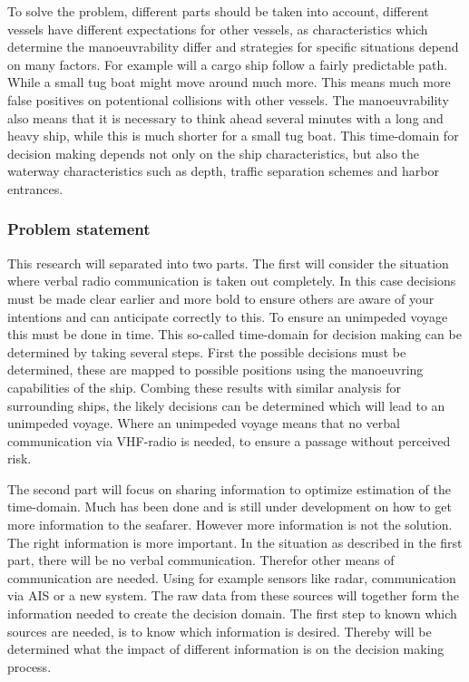 To solve the problem, different parts should be taken into account, different vessels have different expectations for other vessels, as characteristics which determine the manoeuvrability differ and strategies for specific situations depend on many factors. For example will a cargo ship follow a fairly predictable path. While a small tug boat might move around much more. This means much more false positives on potentional collisions with other vessels. The manoeuvrability also means that it is necessary to think ahead several minutes with a long and heavy ship, while this is much shorter for a small tug boat. This time-domain for decision making depends not only on the ship characteristics, but also the waterway characteristics such as depth, traffic separation schemes and harbor entrances.

\subsubsection*{Problem statement}
This research will separated into two parts. The first will consider the situation where verbal radio communication is taken out completely. In this case decisions must be made clear earlier and more bold to ensure others are aware of your intentions and can anticipate correctly to this. To ensure an unimpeded voyage this must be done in time. This so-called time-domain for decision making can be determined by taking several steps. First the possible decisions must be determined, these are mapped to possible positions using the manoeuvring capabilities of the ship. Combing these results with similar analysis for surrounding ships, the likely decisions can be determined which will lead to an unimpeded voyage. Where an unimpeded voyage means that no verbal communication via VHF-radio is needed, to ensure a passage without perceived risk.

The second part will focus on sharing information to optimize estimation of the time-domain. Much has been done and is still under development on how to get more information to the seafarer. However more information is not the solution. The right information is more important. In the situation as described in the first part, there will be no verbal communication. Therefor other means of communication are needed. Using for example sensors like radar, communication via AIS or a new system. The raw data from these sources will together form the information needed to create the decision domain. The first step to known which sources are needed, is to know which information is desired. Thereby will be determined what the impact of different information is on the decision making process.

